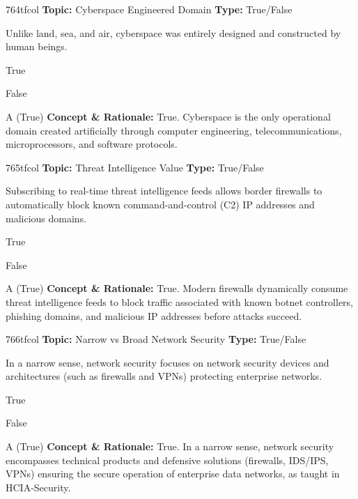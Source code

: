\begin{qcard}{764}{tfcol}
\textcolor{darkslate!75}{\small\textbf{Topic:} Cyberspace Engineered Domain \hfill \textbf{Type:} True/False}\vspace{0.4em}\par
Unlike land, sea, and air, cyberspace was entirely designed and constructed by human beings.
\begin{qoptions}
\item True
\item False
\end{qoptions}
\end{qcard}
\nopagebreak
\begin{explainbox}{A (True)}
\textbf{Concept \& Rationale:} True. Cyberspace is the only operational domain created artificially through computer engineering, telecommunications, microprocessors, and software protocols.
\end{explainbox}

\begin{qcard}{765}{tfcol}
\textcolor{darkslate!75}{\small\textbf{Topic:} Threat Intelligence Value \hfill \textbf{Type:} True/False}\vspace{0.4em}\par
Subscribing to real-time threat intelligence feeds allows border firewalls to automatically block known command-and-control (C2) IP addresses and malicious domains.
\begin{qoptions}
\item True
\item False
\end{qoptions}
\end{qcard}
\nopagebreak
\begin{explainbox}{A (True)}
\textbf{Concept \& Rationale:} True. Modern firewalls dynamically consume threat intelligence feeds to block traffic associated with known botnet controllers, phishing domains, and malicious IP addresses before attacks succeed.
\end{explainbox}

\begin{qcard}{766}{tfcol}
\textcolor{darkslate!75}{\small\textbf{Topic:} Narrow vs Broad Network Security \hfill \textbf{Type:} True/False}\vspace{0.4em}\par
In a narrow sense, network security focuses on network security devices and architectures (such as firewalls and VPNs) protecting enterprise networks.
\begin{qoptions}
\item True
\item False
\end{qoptions}
\end{qcard}
\nopagebreak
\begin{explainbox}{A (True)}
\textbf{Concept \& Rationale:} True. In a narrow sense, network security encompasses technical products and defensive solutions (firewalls, IDS/IPS, VPNs) ensuring the secure operation of enterprise data networks, as taught in HCIA-Security.
\end{explainbox}

